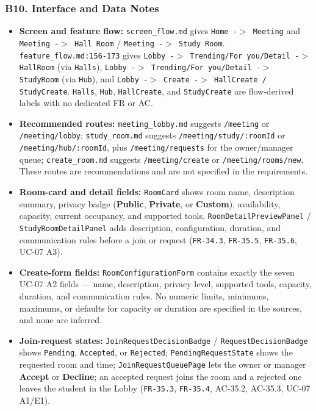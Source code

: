 \documentclass[12pt]{article}
\begin{document}
\hypertarget{sec:b10-interface-and-data-notes}{}
\subsubsection*{B10. Interface and Data Notes}
\par\medskip

\begin{itemize}
\item \textbf{Screen and feature flow:} \texttt{screen\_flow.md} gives \texttt{Home -$>$ Meeting} and \texttt{Meeting -$>$ Hall Room} / \texttt{Meeting -$>$ Study Room}. \texttt{feature\_flow.md:156-173} gives \texttt{Lobby -$>$ Trending/For you/Detail -$>$ HallRoom} (via \texttt{Halls}), \texttt{Lobby -$>$ Trending/For you/Detail -$>$ StudyRoom} (via \texttt{Hub}), and \texttt{Lobby -$>$ Create -$>$ HallCreate / StudyCreate}. \texttt{Halls}, \texttt{Hub}, \texttt{HallCreate}, and \texttt{StudyCreate} are flow-derived labels with no dedicated FR or AC.
\item \textbf{Recommended routes:} \texttt{meeting\_lobby.md} suggests \texttt{/meeting} or \texttt{/meeting/lobby}; \texttt{study\_room.md} suggests \texttt{/meeting/study/:roomId} or \texttt{/meeting/hub/:roomId}, plus \texttt{/meeting/requests} for the owner/manager queue; \texttt{create\_room.md} suggests \texttt{/meeting/create} or \texttt{/meeting/rooms/new}. These routes are recommendations and are not specified in the requirements.
\item \textbf{Room-card and detail fields:} \texttt{RoomCard} shows room name, description summary, privacy badge (\textbf{Public}, \textbf{Private}, or \textbf{Custom}), availability, capacity, current occupancy, and supported tools. \texttt{RoomDetailPreviewPanel} / \texttt{StudyRoomDetailPanel} adds description, configuration, duration, and communication rules before a join or request (\texttt{FR-34.3}, \texttt{FR-35.5}, \texttt{FR-35.6}, UC-07 A3).
\item \textbf{Create-form fields:} \texttt{RoomConfigurationForm} contains exactly the seven UC-07 A2 fields --- name, description, privacy level, supported tools, capacity, duration, and communication rules. No numeric limits, minimums, maximums, or defaults for capacity or duration are specified in the sources, and none are inferred.
\item \textbf{Join-request states:} \texttt{JoinRequestDecisionBadge} / \texttt{RequestDecisionBadge} shows \texttt{Pending}, \texttt{Accepted}, or \texttt{Rejected}; \texttt{PendingRequestState} shows the requested room and time; \texttt{JoinRequestQueuePage} lets the owner or manager \textbf{Accept} or \textbf{Decline}; an accepted request joins the room and a rejected one leaves the student in the Lobby (\texttt{FR-35.3}, \texttt{FR-35.4}, AC-35.2, AC-35.3, UC-07 A1/E1).

\end{itemize}
\end{document}
